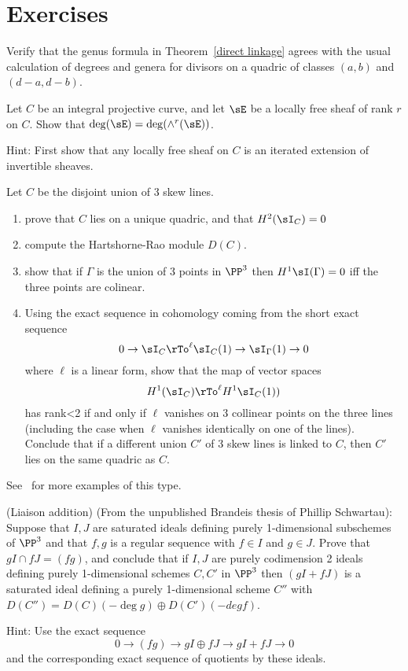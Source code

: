 \section{Exercises}

\begin{exercise}
 Verify that the genus formula in Theorem~\ref{direct linkage} agrees with the usual calculation of degrees and genera for divisors on a quadric of
 classes $(a,b)$ and $(d-a, d-b)$.
\end{exercise}

\begin{exercise}
 Let $C$ be an integral projective curve, and let $\sE$ be a locally free sheaf of rank $r$ on $C$. Show that
 $\deg(\sE) = \deg(\wedge^r(\sE))$.
 
 Hint: First show that any locally free sheaf on $C$ is an iterated extension of invertible sheaves.
\end{exercise}

\begin{exercise}
Let $C$ be the disjoint union of 3 skew lines. 
\begin{enumerate}
 \item prove that $C$ lies on a unique quadric, and that $H^2(\sI_C) = 0$
 \item compute the Hartshorne-Rao module $D(C)$.
 \item show that if $\Gamma$ is the union of 3 points in $\PP^3$ then
 $H^1\sI(\Gamma) = 0$ iff the three points are colinear.
 \item Using the exact sequence in cohomology coming from the short exact sequence
$$
0\to \sI_C \rTo^{\ell} \sI_C(1) \to \sI_\Gamma(1) \to 0
$$
where $\ell$ is a linear form, show that the map of vector spaces
$$
H^1(\sI_C) \rTo^{\ell} H^1\sI_C(1))
$$
has rank<2 if and only if $\ell$ vanishes on 3 collinear points on the three lines (including the case when $\ell$ vanishes identically on one of the lines).
Conclude that if a different union $C'$ of 3 skew lines is linked to $C$, then $C'$ lies on the same quadric as $C$.
\end{enumerate}
See~\cite{Migliore} for more examples of this type.
\end{exercise}

\begin{exercise} (Liaison addition)\label{Liaison addition}
(From the unpublished Brandeis thesis of Phillip Schwartau):
Suppose that $I, J$ are saturated ideals defining purely 1-dimensional subschemes of $\PP^3$
and that $f,g$ is a regular sequence with $f\in I$ and $g\in J$.
Prove that $g I \cap fJ = (fg)$, and conclude that if $I,J$ are purely codimension 2 ideals
 defining purely 1-dimensional schemes $C,C'$ in $\PP^3$
 then  $(gI+fJ)$ is a saturated ideal defining a purely 1-dimensional
scheme $C''$ with $D(C'') = D(C)(-\deg g) \oplus D(C')(-deg f)$.

Hint: Use the exact sequence 
$$
0\to (fg) \to gI \oplus fJ \to gI+fJ \to 0
$$
and the corresponding exact sequence of quotients by these ideals.
\end{exercise}


